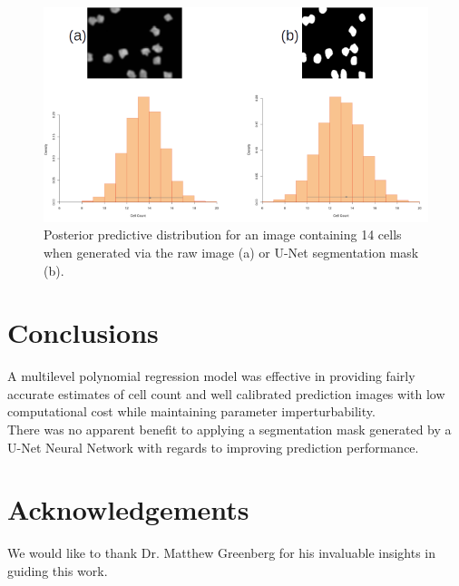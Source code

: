 \documentclass[isoft]{poster_class_UofC}
\begin{document}
\begin{poster}
             \vspace{1cm}
           \begin{figure}
            \centering
            \captionsetup{type=figure}
            \includegraphics[scale=1.7]{./images/PostPredDist.png}
            \caption{Posterior predictive distribution for an image containing 14 cells when generated via the raw image (a) or U-Net segmentation mask (b).}
            \label{fig:PostPredDist}
        \end{figure}   
            \vspace{1cm}
            
    
        \section{Conclusions}
 A multilevel polynomial regression model was effective in providing fairly accurate estimates of cell count and well calibrated prediction images with low computational cost while maintaining parameter imperturbability. \\

 There was no apparent benefit to applying a segmentation mask generated by a U-Net Neural Network with regards to improving prediction performance.
  
        \section{Acknowledgements}
We would like to thank Dr. Matthew Greenberg for his invaluable insights in guiding this work.  

        
        
    
    
    \end{poster}
\end{document}
